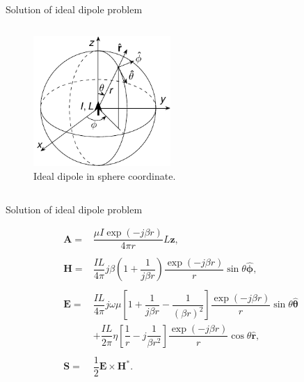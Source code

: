 \begin{frame}{Solution of ideal dipole problem}
\begin{columns}
        \begin{figure}
            \centering
            \includegraphics[width=0.7\textwidth]{Figures/Dipole_in_sphere_coordinate.pdf}
            \caption{Ideal dipole in sphere coordinate.}
            \label{fig:Ideal_dipole}
        \end{figure}
    \end{columns}
\end{frame}


\begin{frame}{Solution of ideal dipole problem}

    \vspace{-6mm}
    
    \begin{align*}
        \mathbf{A} = & \dfrac{\mu I \exp (-j \beta r)}{4 \pi r} L \mathbf{\hat{z}}, \\
        & \\
        \mathbf{H} = & \dfrac{I L}{4\pi} j \beta \left( 1 + \dfrac{1}{j \beta r} \right) \dfrac{ \exp ( - j \beta r) }{r} \sin \theta \mathbf{ \hat{\phi} }, \\
        & \\
        \mathbf{E} = & \dfrac{I L}{4\pi} j \omega \mu \left[ 1 + \dfrac{1}{j \beta r} - \dfrac{1}{(\beta r)^2} \right] \dfrac{ \exp ( - j \beta r) }{r} \sin \theta \mathbf{ \hat{\theta} } \\
        &+ \dfrac{I L}{2\pi} \eta \left[ \dfrac{1}{r} - j \dfrac{1}{\beta r^2} \right] \dfrac{ \exp ( - j \beta r) }{r} \cos \theta \mathbf{ \hat{r} }, \\
        & \\
        \mathbf{S} = & \dfrac{1}{2} \mathbf{E} \times \mathbf{H}^*.
    \end{align*}
\end{frame}